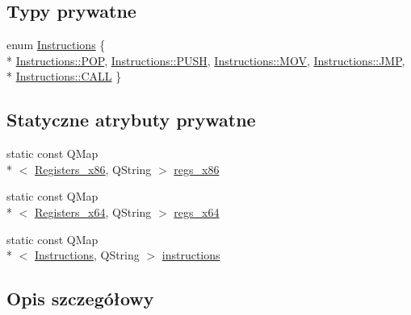 \subsection*{Typy prywatne}
\begin{DoxyCompactItemize}
\item 
enum \hyperlink{class_asm_code_generator_a975bb037f383eb14e8f21acc7c4cd9a8}{Instructions} \{ \\*
\hyperlink{class_asm_code_generator_a975bb037f383eb14e8f21acc7c4cd9a8aefdb39a4c7286afcecf0e8a7435fce6a}{Instructions\-::\-P\-O\-P}, 
\hyperlink{class_asm_code_generator_a975bb037f383eb14e8f21acc7c4cd9a8a73dabe4437725eedc05a1824a2c31550}{Instructions\-::\-P\-U\-S\-H}, 
\hyperlink{class_asm_code_generator_a975bb037f383eb14e8f21acc7c4cd9a8a17b32100aef1fc19670be7fd58bc85df}{Instructions\-::\-M\-O\-V}, 
\hyperlink{class_asm_code_generator_a975bb037f383eb14e8f21acc7c4cd9a8a152b9af76a9e7dd95d9da277b69fdd95}{Instructions\-::\-J\-M\-P}, 
\\*
\hyperlink{class_asm_code_generator_a975bb037f383eb14e8f21acc7c4cd9a8aca3547acb9162b49fb4a6594ed9b3030}{Instructions\-::\-C\-A\-L\-L}
 \}
\end{DoxyCompactItemize}
\subsection*{Statyczne atrybuty prywatne}
\begin{DoxyCompactItemize}
\item 
static const Q\-Map\\*
$<$ \hyperlink{codedefines_8h_a0f84efe4ca4d99203713a78bd6e8c82e}{Registers\-\_\-x86}, Q\-String $>$ \hyperlink{class_asm_code_generator_a112155891be9747ebf0dd45301031053}{regs\-\_\-x86}
\item 
static const Q\-Map\\*
$<$ \hyperlink{codedefines_8h_a5e15b5c4d766f6faf29b5bcec37bde5c}{Registers\-\_\-x64}, Q\-String $>$ \hyperlink{class_asm_code_generator_ab87fdfb10a73e4a7e684b644722408a8}{regs\-\_\-x64}
\item 
static const Q\-Map\\*
$<$ \hyperlink{class_asm_code_generator_a975bb037f383eb14e8f21acc7c4cd9a8}{Instructions}, Q\-String $>$ \hyperlink{class_asm_code_generator_ab017616dbde9a998807080cbc0bff89a}{instructions}
\end{DoxyCompactItemize}


\subsection{Opis szczegółowy}


